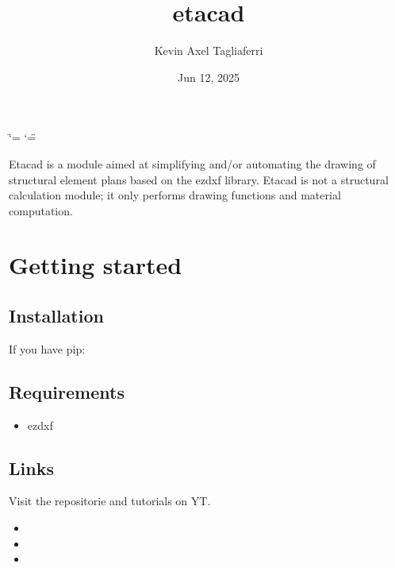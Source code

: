\documentclass[a4paper,10pt,english]{sphinxmanual}
\title{etacad}
\date{Jun 12, 2025}
\author{Kevin Axel Tagliaferri}
\begin{document}
\ifdefined\shorthandoff
  \ifnum\catcode`\=\string=\active\shorthandoff{=}\fi
  \ifnum\catcode`\"=\active{}\fi
\fi

\pagestyle{empty}
\sphinxmaketitle
\pagestyle{plain}
\sphinxtableofcontents
\pagestyle{normal}
\label{\detokenize{index::doc}}


\sphinxAtStartPar
Etacad is a module aimed at simplifying and/or automating the drawing of structural element plans based on the ezdxf library.
Etacad is not a structural calculation module; it only performs drawing functions and material computation.

\sphinxstepscope


\chapter{Getting started}
\label{\detokenize{gettingstarted:getting-started}}\label{\detokenize{gettingstarted::doc}}

\section{Installation}
\label{\detokenize{gettingstarted:installation}}
\sphinxAtStartPar
If you have pip:

\begin{sphinxVerbatim}[commandchars=\\\{\}]
  
\end{sphinxVerbatim}


\section{Requirements}
\label{\detokenize{gettingstarted:requirements}}\begin{itemize}
\item {} 
\sphinxAtStartPar
ezdxf

\end{itemize}


\section{Links}
\label{\detokenize{gettingstarted:links}}
\sphinxAtStartPar
Visit the repositorie and tutorials on YT.
\begin{itemize}
\item {} 
\sphinxAtStartPar
{}

\item {} 
\sphinxAtStartPar
{}

\item {} 
\sphinxAtStartPar
{}

\end{itemize}
\end{document}
